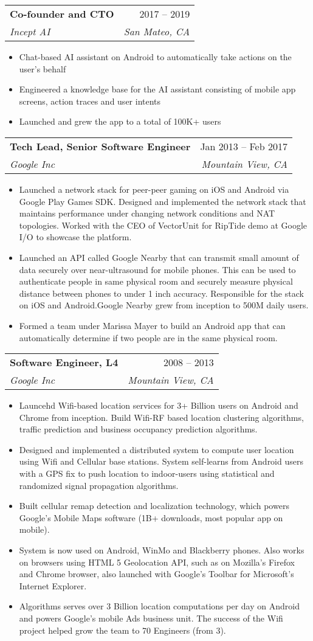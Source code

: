 \documentclass[letterhead,10pt]{article}
\makeatletter
\newcommand{\resumeItem}[1]{
  \item\small{
    {#1 \vspace{-2pt}}
  }
}
\newcommand{\resumeSubheading}[4]{
  \vspace{-2pt}\item
    \begin{tabular*}{0.97\textwidth}[t]{l@{\extracolsep{\fill}}r}
      \textbf{#1} & #2 \\
      \textit{\small#3} & \textit{\small #4} \\
    \end{tabular*}\vspace{-7pt}
}
\newcommand{\resumeItemListStart}{\begin{itemize}}
\newcommand{\resumeItemListEnd}{\end{itemize}\vspace{-5pt}}
\makeatother
\begin{document}
    \resumeSubheading
      {Co-founder and CTO}{2017 -- 2019}
      {Incept AI}{San Mateo, CA}
      \resumeItemListStart
        \resumeItem{Chat-based AI assistant on Android to automatically take actions on the user's behalf}
        \resumeItem{Engineered a knowledge base for the AI assistant consisting of mobile app screens, action traces and user intents}
        \resumeItem{Launched and grew the app to a total of 100K+ users}
    \resumeItemListEnd

    \resumeSubheading
      {Tech Lead, Senior Software Engineer}{Jan 2013 -- Feb 2017}
      {Google Inc}{Mountain View, CA}
      \resumeItemListStart
        \resumeItem{Launched a network stack for peer-peer gaming on iOS and Android via Google Play Games SDK. Designed and implemented the network stack that maintains performance under changing network conditions and NAT topologies. Worked with the CEO of VectorUnit for RipTide
        demo at Google I/O to showcase the platform.}
        \resumeItem{Launched an API called Google Nearby that can transmit small amount of data securely over near-ultrasound for mobile phones. This can
        be used to authenticate people in same physical room and securely measure physical distance
        between phones to under 1 inch accuracy. Responsible for the stack on iOS and Android.Google Nearby grew from inception to 500M daily users.}
        \resumeItem{Formed a team under Marissa Mayer to build an Android app that can automatically determine if two people are in the same physical room.}
      \resumeItemListEnd

    \resumeSubheading
      {Software Engineer, L4}{2008 -- 2013}
      {Google Inc}{Mountain View, CA}
      \resumeItemListStart
        \resumeItem{Launcehd Wifi-based location services for 3+ Billion users on Android and Chrome from inception. Build Wifi-RF based location clustering algorithms, traffic prediction and business occupancy prediction algorithms.}
        \resumeItem{Designed and implemented a distributed system to compute user location using Wifi and Cellular base stations. System self-learns from Android users with a GPS fix to push location to indoor-users using statistical and randomized signal propagation algorithms.}
        \resumeItem{Built cellular remap detection and localization technology, which powers Google's Mobile Maps software (1B+ downloads, most popular app on mobile).}
        \resumeItem{System is now used on Android, WinMo and Blackberry phones. Also works on browsers using HTML 5 Geolocation API, such as on Mozilla's Firefox and Chrome browser, also launched with Google's Toolbar for Microsoft's Internet Explorer.}
        \resumeItem{Algorithms serves over 3 Billion location computations per day on Android and powers Google's mobile Ads business unit. The success of the Wifi project helped grow the team to 70 Engineers (from 3).}
      \resumeItemListEnd
\end{document}
